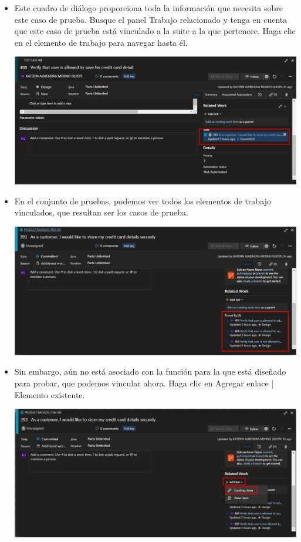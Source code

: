 \begin{itemize}
\item Este cuadro de diálogo proporciona toda la información que necesita sobre este caso de prueba. Busque el panel Trabajo relacionado y tenga en cuenta que este caso de prueba está vinculado a la suite a la que pertenece. Haga clic en el elemento de trabajo para navegar hasta él.
\begin{center}
\includegraphics[width=\columnwidth]{images/22}\newline
\end{center} 

\item En el conjunto de pruebas, podemos ver todos los elementos de trabajo vinculados, que resultan ser los casos de prueba.
\begin{center}
\includegraphics[width=\columnwidth]{images/23}\newline
\end{center}

\item Sin embargo, aún no está asociado con la función para la que está diseñado para probar, que podemos vincular ahora. Haga clic en Agregar enlace | Elemento existente.
\begin{center}
\includegraphics[width=\columnwidth]{images/24}
\end{center} 


\end{itemize}
